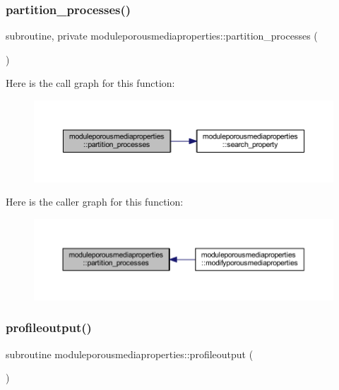 \subsubsection{\texorpdfstring{partition\+\_\+processes()}{partition\_processes()}}
{\footnotesize\ttfamily subroutine, private moduleporousmediaproperties\+::partition\+\_\+processes (\begin{DoxyParamCaption}{ }\end{DoxyParamCaption})\hspace{0.3cm}{\ttfamily [private]}}

Here is the call graph for this function\+:\nopagebreak
\begin{figure}[H]
\begin{center}
\leavevmode
\includegraphics[width=350pt]{namespacemoduleporousmediaproperties_a8875ae5fa2c63a9d71875b7fd07addfb_cgraph}
\end{center}
\end{figure}
Here is the caller graph for this function\+:\nopagebreak
\begin{figure}[H]
\begin{center}
\leavevmode
\includegraphics[width=350pt]{namespacemoduleporousmediaproperties_a8875ae5fa2c63a9d71875b7fd07addfb_icgraph}
\end{center}
\end{figure}
\mbox{\label{namespacemoduleporousmediaproperties_a223a0c32882543deab6de89c82e4295c}} 
\subsubsection{\texorpdfstring{profileoutput()}{profileoutput()}}
{\footnotesize\ttfamily subroutine moduleporousmediaproperties\+::profileoutput (\begin{DoxyParamCaption}{ }\end{DoxyParamCaption})\hspace{0.3cm}{\ttfamily [private]}}

